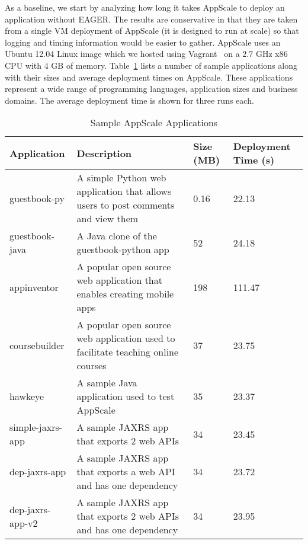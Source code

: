 

As a baseline, we start by analyzing how long it takes AppScale to deploy an
application without EAGER.  The results are conservative in that they are taken from a
single VM deployment of AppScale (it is designed to run at scale) so that
logging and timing information would be easier to gather.  AppScale uses an
Ubuntu 12.04 Linux image which we hosted using Vagrant~\cite{vagrant}    
on a $2.7$ GHz x86 CPU with $4$ GB of memory.
Table~\ref{tab:sample_apps} lists a number of sample
applications along with their sizes and average deployment times on AppScale.
These applications represent a wide range of programming languages,
application sizes and business domains. The average deployment time is shown
for three runs each.

\begin{table}[ht]
\begin{center}
\begin{tabular}{| p{1.5cm} | p{3.2cm} | p{0.5cm} | p{1.1cm} | }
\hline
Application & Description & Size (MB) & Deployment Time (s) \\ \hline
guestbook-py & A simple Python web application that allows users to post
comments and view them & 0.16 & 22.13 \\ \hline
guestbook-java & A Java clone of the guestbook-python app & 52 & 24.18 \\ \hline
appinventor & A popular open source web application that enables creating mobile apps & 198 & 111.47 \\ \hline
coursebuilder & A popular open source web application used to facilitate teaching online courses & 37 & 23.75 \\ \hline
hawkeye & A sample Java application used to test AppScale & 35 & 23.37 \\ \hline
simple-jaxrs-app & A sample JAXRS app that exports 2 web APIs & 34 & 23.45 \\ \hline
dep-jaxrs-app & A sample JAXRS app that exports a web API and has one dependency & 34 & 23.72 \\ \hline
dep-jaxrs-app-v2 & A sample JAXRS app that exports 2 web APIs and has one dependency & 34 & 23.95 \\ \hline
\end{tabular}
\end{center}
\caption{Sample AppScale Applications}
\label{tab:sample_apps}
\end{table}

